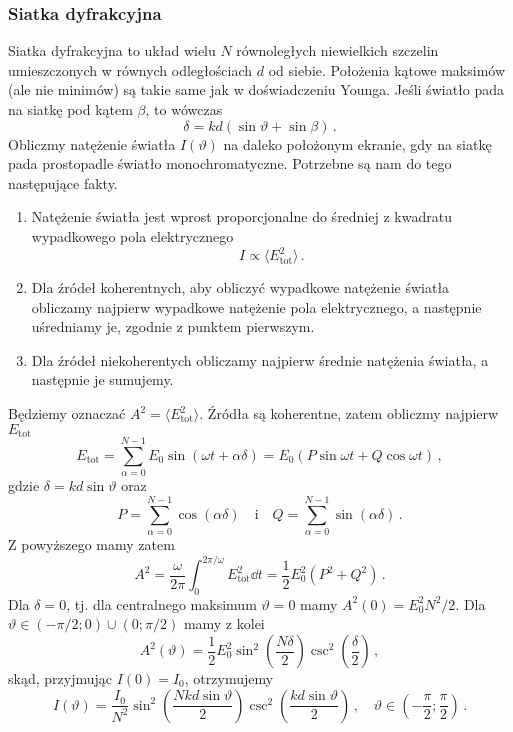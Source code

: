 \documentclass[../main.tex]{subfiles}
\begin{document}
\subsubsection{Siatka dyfrakcyjna}
Siatka dyfrakcyjna to układ wielu \(N\) równoległych niewielkich szczelin umieszczonych w równych odległościach \(d\) od siebie. Położenia kątowe maksimów (ale nie minimów) są takie same jak w doświadczeniu Younga. Jeśli światło pada na siatkę pod kątem \(\beta\), to wówczas
\begin{equation*}
    \delta =kd(\sin\vartheta+\sin\beta)\,.
\end{equation*}
Obliczmy natężenie światła \(I(\vartheta)\) na daleko położonym ekranie, gdy na siatkę pada prostopadle światło monochromatyczne. Potrzebne są nam do tego następujące fakty.
\begin{enumerate}
    \item Natężenie światła jest wprost proporcjonalne do średniej z kwadratu wypadkowego pola elektrycznego
    \begin{equation*}
        I\propto \langle E_\text{tot}^2\rangle\,.
    \end{equation*}
    
    \item Dla źródeł koherentnych, aby obliczyć wypadkowe natężenie światła obliczamy najpierw wypadkowe natężenie pola elektrycznego, a następnie uśredniamy je, zgodnie z punktem pierwszym.
    
    \item Dla źródeł niekoherentych obliczamy najpierw średnie natężenia światła, a następnie je sumujemy.
\end{enumerate}
Będziemy oznaczać \(A^2=\langle E_\text{tot}^2\rangle\). Źródła są koherentne, zatem obliczmy najpierw \(E_\text{tot}\)
\begin{equation*}
    E_\text{tot}=\sum_{\alpha=0}^{N-1}E_0\sin(\omega t+\alpha\delta)=E_0(P\sin\omega t +Q\cos\omega t)\,,
\end{equation*}
gdzie \(\delta =kd\sin\vartheta\) oraz
\begin{equation*}
    P=\sum_{\alpha=0}^{N-1}\cos(\alpha\delta)\quad\text{i}\quad Q=\sum_{\alpha=0}^{N-1}\sin(\alpha\delta)\,.
\end{equation*}
Z powyższego mamy zatem
\begin{equation*}
    A^2=\frac{\omega }{2\pi}\int_0^{2\pi/\omega}E_\text{tot}^2\dd{t}=\frac{1}{2}E_0^2(P^2+Q^2)\,.
\end{equation*}
Dla \(\delta=0\), tj. dla centralnego maksimum \(\vartheta=0\) mamy \(A^2(0)=E_0^2N^2/2\). Dla \(\vartheta\in (-\pi/2;0)\cup(0;\pi/2)\) mamy z kolei
\begin{equation*}
    A^2(\vartheta)=\frac{1}{2}E_0^2\sin^2\left(\frac{N\delta}{2}\right)\csc^2\left(\frac{\delta}{2}\right)\,,
\end{equation*}
skąd, przyjmując \(I(0)=I_0\), otrzymujemy
\begin{equation*}
    I(\vartheta)=\frac{I_0}{N^2}\sin^2\left(\frac{Nkd\sin\vartheta}{2}\right)\csc^2\left(\frac{kd\sin\vartheta}{2}\right)\,,\quad \vartheta\in\left(-\frac{\pi}{2};\frac{\pi}{2}\right)\,.
\end{equation*}
\end{document}
